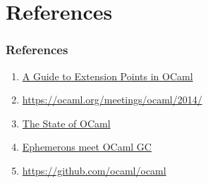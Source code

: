 \section{References}

\begin{frame}
\frametitle{References}
\begin{enumerate}[1)]
\item \href{http://whitequark.org/blog/2014/04/16/a-guide-to-extension-points-in-ocaml/}{A Guide to Extension Points in OCaml}
\item \url{https://ocaml.org/meetings/ocaml/2014/}
\item \href{https://ocaml.org/meetings/ocaml/2014/OCaml2014-Leroy-slides.pdf}{The State of OCaml}
\item \href{https://ocaml.org/meetings/ocaml/2014/ocaml2014_2.pdf}{Ephemerons meet OCaml GC}
\item \url{https://github.com/ocaml/ocaml}
\end{enumerate}
\end{frame}



